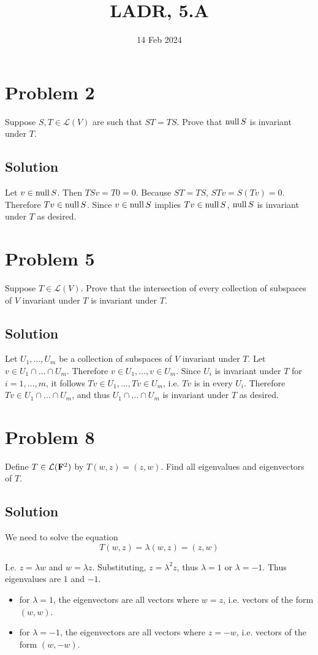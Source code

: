 \documentclass{article}
\title{LADR, 5.A}
\date{14 Feb 2024}
\begin{document}
\maketitle

\section*{Problem 2}
Suppose $S, T\in\mathcal{L}(V)$ are such that $ST=TS$. Prove that $\text{null}\, S$ is invariant under $T$.

\subsection*{Solution}
Let $v\in\text{null}\, S$. Then $TSv=T0=0$. Because $ST=TS$, $STv=S(Tv)=0$. Therefore $Tv\in\text{null}\, S$. Since $v\in\text{null}\, S$ implies $Tv\in\text{null}\, S$, $\text{null}\, S$ is invariant under $T$ as desired.

\section*{Problem 5}
Suppose $T\in\mathcal{L}(V)$. Prove that the intersection of every collection of subspaces of $V$ invariant under $T$ is invariant under $T$.

\subsection*{Solution}
Let $U_1,\ldots,U_m$ be a collection of subspaces of $V$ invariant under $T$. Let $v\in U_1\cap\ldots\cap U_m$. Therefore $v\in U_1,\ldots,v\in U_m$. Since $U_i$ is invariant under $T$ for $i=1,\ldots,m$, it follows $Tv\in U_1,\ldots,Tv\in U_m$, i.e. $Tv$ is in every $U_i$. Therefore $Tv\in U_1\cap\ldots\cap U_m$, and thus $U_1\cap\ldots\cap U_m$ is invariant under $T$ as desired.

\section*{Problem 8}
Define $T\in\mathcal{L}(\mathbf{F}^2)$ by $T(w,z)=(z,w)$. Find all eigenvalues and eigenvectors of $T$.

\subsection*{Solution}
We need to solve the equation
\[T(w,z)=\lambda(w,z)=(z,w)\]

I.e. $z=\lambda w$ and $w=\lambda z$. Substituting, $z=\lambda^2z$, thus $\lambda=1$ or $\lambda=-1$. Thus eigenvalues are $1$ and $-1$.
\begin{itemize}
    \item for $\lambda=1$, the eigenvectors are all vectors where $w=z$, i.e. vectors of the form $(w,w)$.
    \item for $\lambda=-1$, the eigenvectors are all vectors where $z=-w$, i.e. vectors of the form $(w,-w)$.
\end{itemize}
\end{document}
